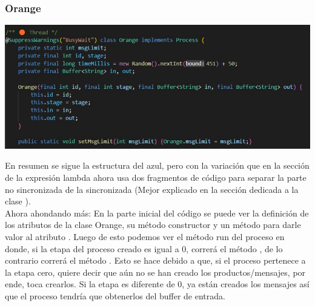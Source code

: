 \documentclass[a4paper]{article}
\begin{document}
    \subsubsection{Orange}
    
    \begin{center}
        \includegraphics[scale=0.5]{N0.jpeg}    
    \end{center}

    En resumen se sigue la estructura del azul, pero con la variaci\'on que en la secci\'on de la expresi\'on lambda ahora usa dos fragmentos de c\'odigo para separar la parte no sincronizada de la sincronizada (Mejor explicado en la secci\'on dedicada a la clase ).\\
    Ahora ahondando m\'as: En la parte inicial del c\'odigo se puede ver la definici\'on de los atributos de la clase Orange, su m\'etodo constructor y un m\'etodo para darle valor al atributo .
    Luego de esto podemos ver el m\'etodo run del proceso en donde, si la etapa del proceso creado es igual a 0, correr\'a el m\'etodo , de lo contrario correr\'a el m\'etodo . Esto se hace debido a que, si el proceso pertenece a la etapa cero, quiere decir que a\'un no se han creado los productos/mensajes, por ende, toca crearlos. Si la etapa es diferente de 0, ya est\'an creados los mensajes as\'i que el proceso tendr\'ia que obtenerlos del buffer de entrada.
\end{document}
